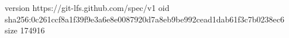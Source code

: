 version https://git-lfs.github.com/spec/v1
oid sha256:0c261ccf8a1f39f9e3a6e8e0087920d7a8eb9be992cead1dab61f3c7b0238ec6
size 174916
